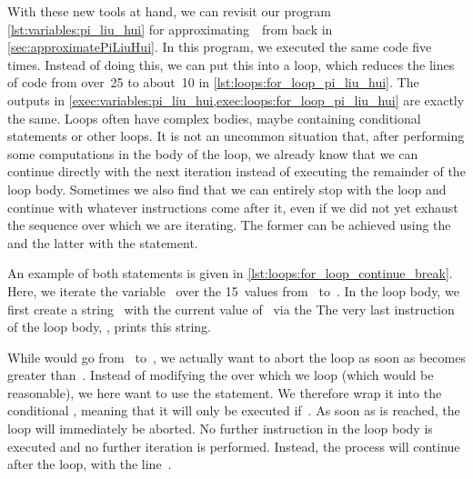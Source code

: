With these new tools at hand, we can revisit our program \cref{lst:variables:pi_liu_hui} for approximating~\numberPi\ from back in \cref{sec:approximatePiLiuHui}.
In this program, we executed the same code five times.
Instead of doing this, we can put this into a loop, which reduces the lines of code from over~25 to about~10 in \cref{lst:loops:for_loop_pi_liu_hui}.
The outputs in \cref{exec:variables:pi_liu_hui,exec:loops:for_loop_pi_liu_hui} are exactly the same.%
%
\FloatBarrier%
\endhsection%
%
%
%
%
%
Loops often have complex bodies, maybe containing conditional statements or other loops.
It is not an uncommon situation that, after performing some computations in the body of the loop, we already know that we can continue directly with the next iteration instead of executing the remainder of the loop body.
Sometimes we also find that we can entirely stop with the loop and continue with whatever instructions come after it, even if we did not yet exhaust the sequence over which we are iterating.
The former can be achieved using the  and the latter with the  statement.

An example of both statements is given in \cref{lst:loops:for_loop_continue_break}.
Here, we iterate the variable~ over the 15~values from~ to~.
In the loop body, we first create a string~ with the current value of~ via the  
The very last instruction of the loop body, , prints this string.

While  would go from~ to~, we actually want to abort the loop as soon as  becomes greater than~.
Instead of modifying the  over which we loop (which would be reasonable), we here want to use the  statement.
We therefore wrap it into the conditional , meaning that it will only be executed if~.
As soon as  is reached, the loop will immediately be aborted.
No further instruction in the loop body is executed and no further iteration is performed.
Instead, the process will continue after the loop, with the line~.

